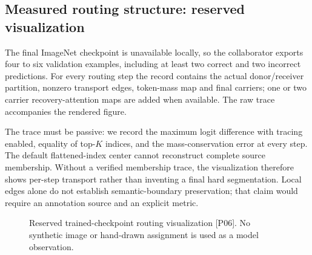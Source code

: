 \subsection{Measured routing structure: reserved visualization}
\label{sec:pending-routing}

The final ImageNet checkpoint is unavailable locally, so the collaborator
exports four to six validation examples, including at least two correct and
two incorrect predictions. For every routing step the record contains the
actual donor/receiver partition, nonzero transport edges, token-mass map and
final carriers; one or two carrier recovery-attention maps are added when
available. The raw trace accompanies the rendered figure.

The trace must be passive: we record the maximum logit difference with tracing
enabled, equality of top-$K$ indices, and the mass-conservation error at every
step. The default flattened-index center cannot reconstruct complete source
membership. Without a verified membership trace, the visualization therefore
shows per-step transport rather than inventing a final hard segmentation.
Local edges alone do not establish semantic-boundary preservation; that claim
would require an annotation source and an explicit metric.

\begin{figure}[htbp]\centering
{}
\caption{Reserved trained-checkpoint routing visualization [P06]. No
synthetic image or hand-drawn assignment is used as a model observation.}
\label{fig:pending-routing}\end{figure}
\pendingtext
